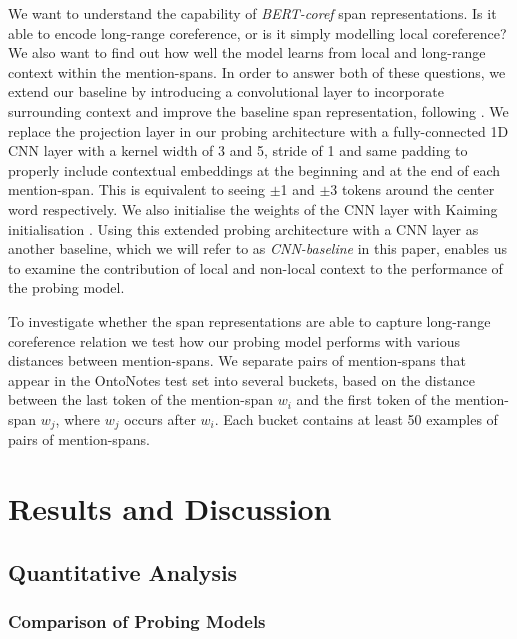 \documentclass[11pt]{article}
\begin{document}
We want to understand the capability of \textit{BERT-coref} span representations. Is it able to encode long-range coreference, or is it simply modelling local coreference? We also want to find out how well the model learns from local and long-range context within the mention-spans. In order to answer both of these questions, we extend our baseline by introducing a convolutional layer to incorporate surrounding context and improve the baseline span representation, following \textcite{tenney2019context}. We replace the projection layer in our probing architecture with a fully-connected 1D CNN layer with a kernel width of 3 and 5, stride of 1 and same padding to properly include contextual embeddings at the beginning and at the end of each mention-span. This is equivalent to seeing $\pm$1 and $\pm$3 tokens around the center word respectively. We also initialise the weights of the CNN layer with Kaiming initialisation \parencite{kaiming}. Using this extended probing architecture with a CNN layer as another baseline, which we will refer to as \textit{CNN-baseline} in this paper, enables us to examine the contribution of local and non-local context to the performance of the probing model. 

To investigate whether the span representations are able to capture long-range coreference relation we test how our probing model performs with various distances between mention-spans. We separate pairs of mention-spans that appear in the OntoNotes test set into several buckets, based on the distance between the last token of the mention-span $w_{i}$ and the first token of the  mention-span $w_{j}$, where $w_{j}$ occurs after $w_{i}$. Each bucket contains at least 50 examples of pairs of mention-spans. 




\section{Results and Discussion}
\subsection{Quantitative Analysis}
\subsubsection{Comparison of Probing Models}
\end{document}
